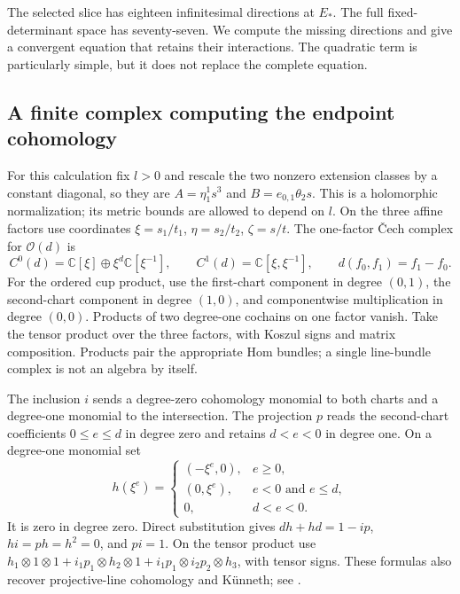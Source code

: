 \documentclass[11pt]{amsart}
\theoremstyle{definition}
\theoremstyle{remark}
\newcommand{\CC}{\mathbb C}
\newcommand{\cO}{\mathcal O}
\begin{document}
The selected slice has eighteen infinitesimal directions at $E_*$.
The full fixed-determinant space has seventy-seven. We compute the missing
directions and give a convergent equation that retains their interactions.
The quadratic term is particularly simple, but it does not replace the
complete equation.

\subsection{A finite complex computing the endpoint cohomology}
For this calculation fix $l>0$ and rescale the two nonzero extension
classes by a constant diagonal, so they are
$A=\eta_1^1s^3$ and $B=e_{0,1}\theta_2s$.
This is a holomorphic normalization; its metric bounds are allowed to
depend on $l$. On the three affine factors use coordinates
$\xi=s_1/t_1$, $\eta=s_2/t_2$, $\zeta=s/t$.
The one-factor \v Cech complex for $\cO(d)$ is
\begin{equation}\label{eq:cech-complex}
 C^0(d)=\CC[\xi]\oplus\xi^d\CC[\xi^{-1}],\qquad
 C^1(d)=\CC[\xi,\xi^{-1}],\qquad
 d(f_0,f_1)=f_1-f_0.
\end{equation}
For the ordered cup product, use the first-chart component in degree
$(0,1)$, the second-chart component in degree $(1,0)$, and componentwise
multiplication in degree $(0,0)$. Products of two degree-one cochains
on one factor vanish. Take the tensor product over the three factors,
with Koszul signs and matrix composition. Products pair the appropriate
Hom bundles; a single line-bundle complex is not an algebra by itself.

The inclusion $i$ sends a degree-zero cohomology monomial to both charts
and a degree-one monomial to the intersection. The projection $p$ reads
the second-chart coefficients $0\le e\le d$ in degree zero and retains
$d<e<0$ in degree one. On a degree-one monomial set
\begin{equation}\label{eq:cech-homotopy}
 h(\xi^e)=
 \begin{cases}
 (-\xi^e,0),& e\ge0,\\
 (0,\xi^e),&e<0\text{ and }e\le d,\\
 0,&d<e<0.
 \end{cases}
\end{equation}
It is zero in degree zero. Direct substitution gives
$dh+hd=1-ip$, $hi=ph=h^2=0$, and $pi=1$.
On the tensor product use
$h_1\otimes1\otimes1+i_1p_1\otimes h_2\otimes1+
 i_1p_1\otimes i_2p_2\otimes h_3$, with tensor signs.
These formulas also recover projective-line cohomology and K\"unneth;
see \cite[Tags~01XT and 0BED]{stacks}.
\end{document}

